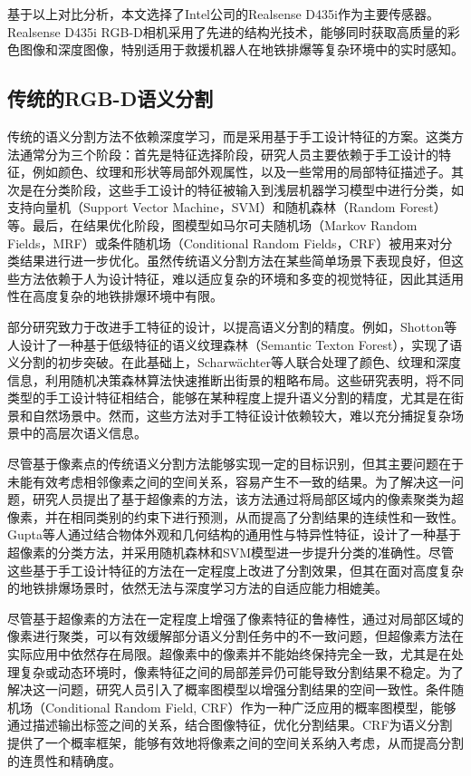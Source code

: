 基于以上对比分析，本文选择了Intel公司的Realsense D435i作为主要传感器。
Realsense D435i RGB-D相机采用了先进的结构光技术，能够同时获取高质量的彩色图像和深度图像，特别适用于救援机器人在地铁排爆等复杂环境中的实时感知。





\subsection{传统的RGB-D语义分割}
传统的语义分割方法不依赖深度学习，而是采用基于手工设计特征的方案。这类方法通常分为三个阶段：首先是特征选择阶段，研究人员主要依赖于手工设计的特征，例如颜色、纹理和形状等局部外观属性，以及一些常用的局部特征描述子。其次是在分类阶段，这些手工设计的特征被输入到浅层机器学习模型中进行分类，如支持向量机（Support Vector Machine，SVM）和随机森林（Random Forest）等。最后，在结果优化阶段，图模型如马尔可夫随机场（Markov Random Fields，MRF）或条件随机场（Conditional Random Fields，CRF）被用来对分类结果进行进一步优化。虽然传统语义分割方法在某些简单场景下表现良好，但这些方法依赖于人为设计特征，难以适应复杂的环境和多变的视觉特征，因此其适用性在高度复杂的地铁排爆环境中有限。

部分研究致力于改进手工特征的设计，以提高语义分割的精度。例如，Shotton等人\cite{Shotton08CVPR}设计了一种基于低级特征的语义纹理森林（Semantic Texton Forest），实现了语义分割的初步突破。在此基础上，Scharwächter等人\cite{Scharwächter15IVS}联合处理了颜色、纹理和深度信息，利用随机决策森林算法快速推断出街景的粗略布局。这些研究表明，将不同类型的手工设计特征相结合，能够在某种程度上提升语义分割的精度，尤其是在街景和自然场景中。然而，这些方法对手工特征设计依赖较大，难以充分捕捉复杂场景中的高层次语义信息。

尽管基于像素点的传统语义分割方法能够实现一定的目标识别，但其主要问题在于未能有效考虑相邻像素之间的空间关系，容易产生不一致的结果。为了解决这一问题，研究人员提出了基于超像素的方法，该方法通过将局部区域内的像素聚类为超像素，并在相同类别的约束下进行预测，从而提高了分割结果的连续性和一致性。Gupta等人\cite{Gupta15IJCV}通过结合物体外观和几何结构的通用性与特异性特征，设计了一种基于超像素的分类方法，并采用随机森林和SVM模型进一步提升分类的准确性。尽管这些基于手工设计特征的方法在一定程度上改进了分割效果，但其在面对高度复杂的地铁排爆场景时，依然无法与深度学习方法的自适应能力相媲美。

尽管基于超像素的方法在一定程度上增强了像素特征的鲁棒性，通过对局部区域的像素进行聚类，可以有效缓解部分语义分割任务中的不一致问题，但超像素方法在实际应用中依然存在局限。超像素中的像素并不能始终保持完全一致，尤其是在处理复杂或动态环境时，像素特征之间的局部差异仍可能导致分割结果不稳定。为了解决这一问题，研究人员引入了概率图模型以增强分割结果的空间一致性。条件随机场（Conditional Random Field, CRF）作为一种广泛应用的概率图模型，能够通过描述输出标签之间的关系，结合图像特征，优化分割结果。CRF为语义分割提供了一个概率框架，能够有效地将像素之间的空间关系纳入考虑，从而提高分割的连贯性和精确度。

